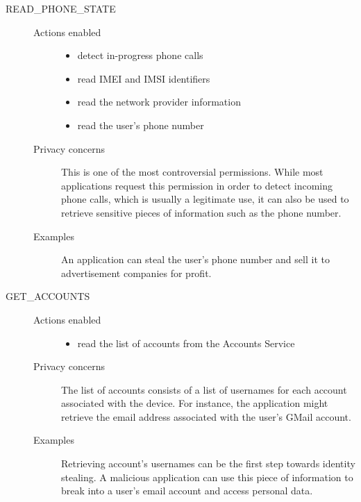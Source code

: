 \documentclass[twoside,letterpaper]{soups}
\theoremstyle{definition}
\begin{document}
\begin{description}
    \item[READ\_PHONE\_STATE] \hfill
        \begin{description}
             \item[Actions enabled] \hfill
                \begin{itemize}
                    \item detect in-progress phone calls
                    \item read IMEI and IMSI identifiers
                    \item read the network provider information
                    \item read the user's phone number
                 \end{itemize} 
             \item[Privacy concerns]
                This is one of the most controversial permissions. While most applications request this permission in order to detect incoming phone calls, which is usually a legitimate use, it can also be used to retrieve sensitive pieces of information such as the phone number.
             \item[Examples]
                An application can steal the user's phone number and sell it to advertisement companies for profit.

         \end{description} 

    \item[GET\_ACCOUNTS] \hfill
        \begin{description}
             \item[Actions enabled] \hfill
                \begin{itemize}
                    \item read the list of accounts from the Accounts Service
                 \end{itemize} 
             \item[Privacy concerns]
                The list of accounts consists of a list of usernames for each account associated with the device. For instance, the application might retrieve the email address associated with the user's GMail account.
             \item[Examples]
                Retrieving account's usernames can be the first step towards identity stealing. A malicious application can use this piece of information to break into a user's email account and access personal data.
         \end{description} 


\end{description}
\end{document}

